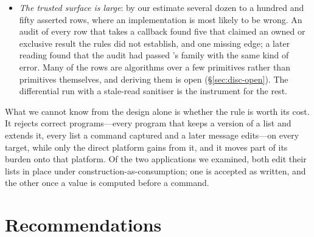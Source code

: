 \begin{itemize}
by an implementation. The frequency of the error on real idiomatic code is unknown until the report mode
runs.
\item \emph{The trusted surface is large}: by our estimate several dozen to a hundred and fifty asserted
rows, where an implementation is most likely to be wrong. An audit of every row that takes a callback
found five that claimed an owned or exclusive result the rules did not establish, and one missing edge;
a later reading found that the audit had passed 's family with the same kind of error. Many of
the rows are algorithms over a few primitives rather than primitives themselves, and deriving them is
open (\S\ref{sec:disc-open}). The differential run with a stale-read sanitiser is the instrument for the rest.
\end{itemize}

What we cannot know from the design alone is whether the rule is worth its cost. It rejects correct
programs---every program that keeps a version of a list and extends it, every list a command captured and
a later message edits---on every target, while only the direct platform gains from it, and it moves part
of its burden onto that platform. Of the two applications we examined, both edit their lists in place under
construction-as-consumption; one is accepted as written, and the other once a value is computed before a
command.

\section{Recommendations}
\label{sec:conc-recommend}

